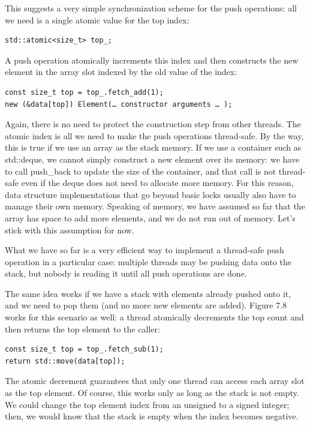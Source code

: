 This suggests a very simple synchronization scheme for the push operations: all we need is a single atomic value for the top index:

\begin{lstlisting}[style=styleCXX]
std::atomic<size_t> top_;
\end{lstlisting}

A push operation atomically increments this index and then constructs the new element in the array slot indexed by the old value of the index:

\begin{lstlisting}[style=styleCXX]
const size_t top = top_.fetch_add(1);
new (&data[top]) Element(… constructor arguments … );
\end{lstlisting}

Again, there is no need to protect the construction step from other threads. The atomic index is all we need to make the push operations thread-safe. By the way, this is true if we use an array as the stack memory. If we use a container such as std::deque, we cannot simply construct a new element over its memory: we have to call push\_back to update the size of the container, and that call is not thread-safe even if the deque does not need to allocate more memory. For this reason, data structure implementations that go beyond basic locks usually also have to manage their own memory. Speaking of memory, we have assumed so far that the array has space to add more elements, and we do not run out of memory. Let's stick with this assumption for now.

What we have so far is a very efficient way to implement a thread-safe push operation in a particular case: multiple threads may be pushing data onto the stack, but nobody is reading it until all push operations are done.

The same idea works if we have a stack with elements already pushed onto it, and we need to pop them (and no more new elements are added). Figure 7.8 works for this scenario as well: a thread atomically decrements the top count and then returns the top element to the caller:

\begin{lstlisting}[style=styleCXX]
const size_t top = top_.fetch_sub(1);
return std::move(data[top]);
\end{lstlisting}

The atomic decrement guarantees that only one thread can access each array slot as the top element. Of course, this works only as long as the stack is not empty. We could change the top element index from an unsigned to a signed integer; then, we would know that the stack is empty when the index becomes negative.

